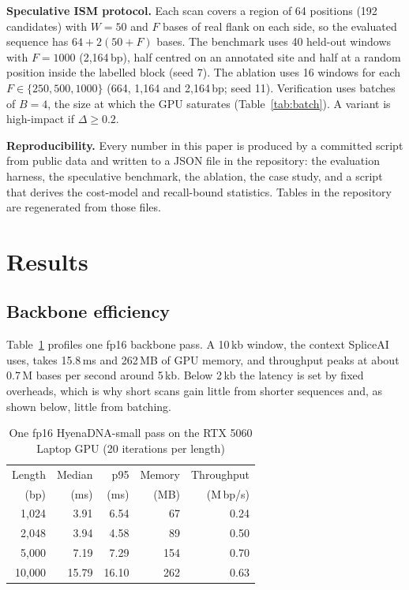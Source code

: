 \documentclass[conference]{IEEEtran}
\begin{document}
\textbf{Speculative ISM protocol.} Each scan covers a region of 64 positions (192 candidates) with $W=50$ and $F$ bases of real flank on each side, so the evaluated sequence has $64+2(50+F)$ bases. The benchmark uses 40 held-out windows with $F=1000$ (2{,}164\,bp), half centred on an annotated site and half at a random position inside the labelled block (seed 7). The ablation uses 16 windows for each $F\in\{250,500,1000\}$ (664, 1{,}164 and 2{,}164\,bp; seed 11). Verification uses batches of $B=4$, the size at which the GPU saturates (Table~\ref{tab:batch}). A variant is high-impact if $\Delta\ge0.2$.

\textbf{Reproducibility.} Every number in this paper is produced by a committed script from public data and written to a JSON file in the repository: the evaluation harness, the speculative benchmark, the ablation, the case study, and a script that derives the cost-model and recall-bound statistics. Tables in the repository are regenerated from those files.

\section{Results}\label{sec:results}
\subsection{Backbone efficiency}
Table~\ref{tab:latency} profiles one fp16 backbone pass. A 10\,kb window, the context SpliceAI uses, takes 15.8\,ms and 262\,MB of GPU memory, and throughput peaks at about 0.7\,M bases per second around 5\,kb. Below 2\,kb the latency is set by fixed overheads, which is why short scans gain little from shorter sequences and, as shown below, little from batching.

\begin{table}[t]
\centering
\caption{One fp16 HyenaDNA-small pass on the RTX 5060 Laptop GPU (20 iterations per length)}
\label{tab:latency}
\begin{tabular}{rrrrr}
\toprule
Length & Median & p95 & Memory & Throughput \\
(bp) & (ms) & (ms) & (MB) & (M\,bp/s) \\
\midrule
1{,}024 & 3.91 & 6.54 & 67 & 0.24 \\
2{,}048 & 3.94 & 4.58 & 89 & 0.50 \\
5{,}000 & 7.19 & 7.29 & 154 & 0.70 \\
10{,}000 & 15.79 & 16.10 & 262 & 0.63 \\
\bottomrule
\end{tabular}
\end{table}
\end{document}
